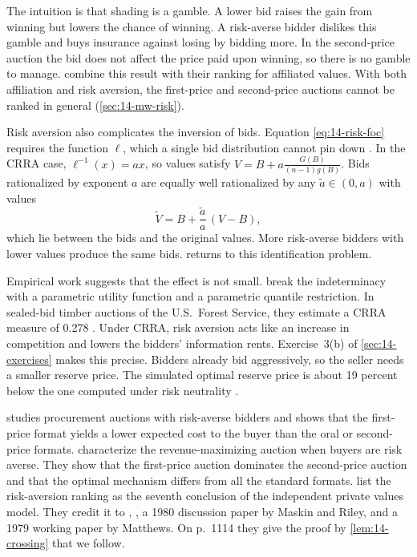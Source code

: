 The intuition is that shading is a gamble. A lower bid raises the gain from winning but lowers the chance of winning. A risk-averse bidder dislikes this gamble and buys insurance against losing by bidding more. In the second-price auction the bid does not affect the price paid upon winning, so there is no gamble to manage.  combine this result with their ranking for affiliated values. With both affiliation and risk aversion, the first-price and second-price auctions cannot be ranked in general (\cref{sec:14-mw-risk}).

Risk aversion also complicates the inversion of bids. Equation \eqref{eq:14-risk-foc} requires the function $\ell$, which a single bid distribution cannot pin down \citep[Section 6.4]{AtheyHaile2007}. In the CRRA case, $\ell^{-1}(x)=ax$, so values satisfy $V=B+a\frac{G(B)}{(n-1)g(B)}$. Bids rationalized by exponent $a$ are equally well rationalized by any $\tilde a\in(0,a)$ with values
\[
\tilde V=B+\frac{\tilde a}{a}\,(V-B),
\]
which lie between the bids and the original values. More risk-averse bidders with lower values produce the same bids.  returns to this identification problem.

Empirical work suggests that the effect is not small.  break the indeterminacy with a parametric utility function and a parametric quantile restriction. In sealed-bid timber auctions of the U.S.\ Forest Service, they estimate a CRRA measure of 0.278 \citep[Section~2.4, p.~95]{HortacsuPerrigne2021}. Under CRRA, risk aversion acts like an increase in competition and lowers the bidders' information rents. Exercise~3(b) of \cref{sec:14-exercises} makes this precise. Bidders already bid aggressively, so the seller needs a smaller reserve price. The simulated optimal reserve price is about 19 percent below the one computed under risk neutrality \citep[p.~95]{HortacsuPerrigne2021}.

 \citet{Holt1980} studies procurement auctions with risk-averse bidders and shows that the first-price format yields a lower expected cost to the buyer than the oral or second-price formats.  characterize the revenue-maximizing auction when buyers are risk averse. They show that the first-price auction dominates the second-price auction and that the optimal mechanism differs from all the standard formats.
 list the risk-aversion ranking as the seventh conclusion of the independent private values model. They credit it to \citet{HarrisRaviv1981}, \citet{Holt1980}, a 1980 discussion paper by Maskin and Riley, and a 1979 working paper by Matthews. On p.~1114 they give the proof by \cref{lem:14-crossing} that we follow.

